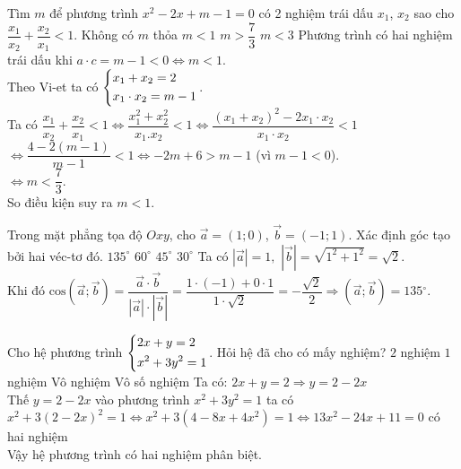 \begin{ex}%
Tìm $m$ để phương trình $x^2-2x+m-1=0$ có 2 nghiệm trái dấu $x_1$, $x_2$ sao cho $\dfrac{x_1}{x_2}+\dfrac{x_2}{x_1}<1$.
\choice
{Không có $m$ thỏa}
{\True $m<1$}
{$m>\dfrac{7}{3}$}
{$m<3$}
\loigiai
{Phương trình có hai nghiệm trái dấu khi $a\cdot c=m-1<0\Leftrightarrow m<1$.\\
	Theo Vi-et ta có $\left\{\begin{aligned}& x_1+x_2=2 \\
		& x_1\cdot x_2=m-1 \\
	\end{aligned}\right.$.\\
	Ta có $\dfrac{x_1}{x_2}+\dfrac{x_2}{x_1}<1\Leftrightarrow \dfrac{x_1^2+x_2^2}{x_1.x_2}<1\Leftrightarrow \dfrac{{{(x_1+x_2 )}^2}-2x_1\cdot x_2}{x_1\cdot x_2}<1$\\
	$\Leftrightarrow \dfrac{4-2(m-1 )}{m-1}<1\Leftrightarrow -2m+6>m-1$ (vì $m-1<0$).\\
	$\Leftrightarrow m<\dfrac{7}{3}$.\\
So điều kiện suy ra $m<1$.}
\end{ex}
\begin{ex}%
Trong mặt phẳng tọa độ $Oxy$, cho $\vec{a}=(1;0 )$, $\vec{b}=(-1;1 )$. Xác định góc tạo bởi hai véc-tơ đó.
\choice
{\True ${{135}^{\circ }}$}
{${{60}^{\circ }}$}
{${{45}^{\circ }}$}
{${{30}^{\circ }}$}
\loigiai
{Ta có $\left| \vec{a} \right|=1,\,\,\left| \vec{b} \right|=\sqrt{{{1}^2}+{{1}^2}}=\sqrt{2}$.\\
	Khi đó $\text{cos}(\vec{a};\vec{b} )=\dfrac{\vec{a}\cdot\vec{b}}{\left| \vec{a} \right|\cdot\left| \vec{b} \right|}=\dfrac{1\cdot(-1 )+0\cdot1}{1\cdot\sqrt{2}}=-\dfrac{\sqrt{2}}{2}\Rightarrow (\vec{a};\vec{b} )=135{}^\circ $.}
\end{ex}
\begin{ex}%
Cho hệ phương trình $\left\{\begin{aligned}& 2x+y=2 \\
	& x^2+3{{y}^2}=1 \\
\end{aligned}\right.$. Hỏi hệ đã cho có mấy nghiệm?
\choice
{\True $2$ nghiệm}
{$1$ nghiệm}
{Vô nghiệm}
{Vô số nghiệm}
\loigiai
{Ta có: $2x+y=2\Rightarrow y=2-2x$\\
	Thế $y=2-2x$ vào phương trình $x^2+3{{y}^2}=1$ ta có\\ $x^2+3{{(2-2x)}^2}=1\Leftrightarrow x^2+3(4-8x+4x^2 )=1\Leftrightarrow 13x^2-24x+11=0$ có hai nghiệm\\
	Vậy hệ phương trình có hai nghiệm phân biệt.}
\end{ex}
